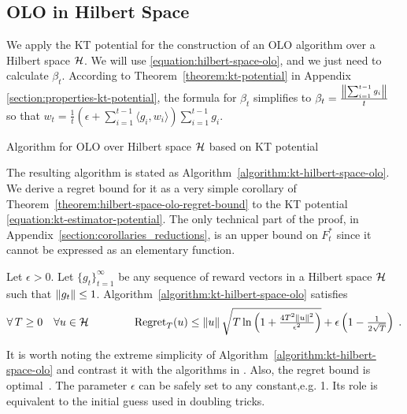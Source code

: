 \vspace{-0.1cm}

\subsection{OLO in Hilbert Space}
\label{section:kt-olo}

We apply the KT potential for the construction of an OLO algorithm over a Hilbert
space $\mathcal{H}$. We will use \eqref{equation:hilbert-space-olo}, and we just need to calculate
$\beta_t$. According to Theorem~\ref{theorem:kt-potential} in Appendix
\ref{section:properties-kt-potential}, the formula for $\beta_t$ simplifies to
$\beta_t = \frac{\left\|{\sum_{i=1}^{t-1} g_i}\right\|}{t}$ so that $w_t = \tfrac{1}{t} \left(\epsilon + \sum_{i=1}^{t-1} \langle g_i, w_i \rangle \right) \sum_{i=1}^{t-1} g_i$.

\begin{algorithm}[t]
\caption{Algorithm for OLO over Hilbert space $\mathcal{H}$ based on KT potential
\label{algorithm:kt-hilbert-space-olo}}
\begin{algorithmic}[1]
{
\ENDFOR
}
\end{algorithmic}
\end{algorithm}

The resulting algorithm is stated as Algorithm~\ref{algorithm:kt-hilbert-space-olo}.  We
derive a regret bound for it as a very simple corollary of
Theorem~\ref{theorem:hilbert-space-olo-regret-bound} to the KT potential
\eqref{equation:kt-estimator-potential}. The only technical
part of the proof, in Appendix~\ref{section:corollaries_reductions}, is an upper bound on $F_t^*$ since it cannot
be expressed as an elementary function.
%
\begin{corollary}
\label{corollary:kt-hilbert-space-olo-regret} Let $\epsilon > 0$. Let
$\{g_t\}_{t=1}^\infty$ be any sequence of reward vectors in a Hilbert space
$\mathcal{H}$ such that $\left\|{g_t}\right\| \le 1$.
Algorithm~\ref{algorithm:kt-hilbert-space-olo} satisfies
\[
\forall \, T \ge 0 \quad
\forall u \in \mathcal{H} \qquad \qquad
\operatorname{Regret}_T(u) \le \left\|{u}\right\| \sqrt{T \ln\left(1 + \tfrac{4T^2 \left\|{u}\right\|^2}{\epsilon^2} \right)} + \epsilon \left(1 - \tfrac{1}{2\sqrt{T}} \right) \;.
\]
\end{corollary}
%
It is worth noting the extreme simplicity of Algorithm~\ref{algorithm:kt-hilbert-space-olo} and contrast it with the algorithms in \cite{Streeter-McMahan-2012,McMahan-Orabona-2014,Orabona-2013,Orabona-2014}.
Also, the regret bound is optimal~\cite{Streeter-McMahan-2012,Orabona-2013}. The parameter $\epsilon$ can be safely set to any constant,e.g. 1. Its role is equivalent to the initial guess used in doubling tricks.


